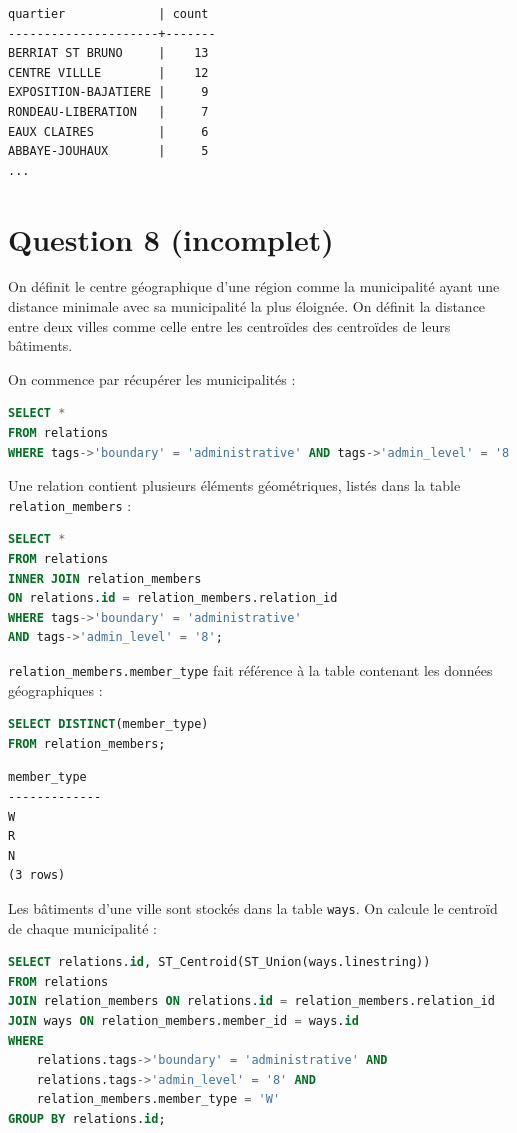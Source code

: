 \documentclass[12pt,a4paper]{article}
\begin{document}
\begin{lstlisting}
quartier             | count 
---------------------+-------
BERRIAT ST BRUNO     |    13
CENTRE VILLLE        |    12
EXPOSITION-BAJATIERE |     9
RONDEAU-LIBERATION   |     7
EAUX CLAIRES         |     6
ABBAYE-JOUHAUX       |     5
...
\end{lstlisting}

\vspace{1cm}
\section*{Question 8 (incomplet)}

On définit le centre géographique d'une région comme la municipalité ayant une
distance minimale avec sa municipalité la plus éloignée. On définit la distance
entre deux villes comme celle entre les centroïdes des centroïdes de leurs bâtiments.

On commence par récupérer les municipalités :

\begin{lstlisting}[language=SQL]
SELECT *
FROM relations
WHERE tags->'boundary' = 'administrative' AND tags->'admin_level' = '8';
\end{lstlisting}

Une relation contient plusieurs éléments géométriques, listés dans la table
\verb?relation_members? :

\begin{lstlisting}[language=SQL]
SELECT *
FROM relations
INNER JOIN relation_members 
ON relations.id = relation_members.relation_id
WHERE tags->'boundary' = 'administrative' 
AND tags->'admin_level' = '8';
\end{lstlisting}

\verb?relation_members.member_type? fait référence à la table contenant les données
géographiques :

\begin{lstlisting}[language=SQL]
SELECT DISTINCT(member_type)
FROM relation_members;
\end{lstlisting}

\begin{lstlisting}
member_type 
-------------
W
R
N
(3 rows)
\end{lstlisting}

Les bâtiments d'une ville sont stockés dans la table \verb?ways?. On calcule le centroïd
de chaque municipalité :

\begin{lstlisting}[language=SQL]
SELECT relations.id, ST_Centroid(ST_Union(ways.linestring))
FROM relations
JOIN relation_members ON relations.id = relation_members.relation_id
JOIN ways ON relation_members.member_id = ways.id
WHERE
    relations.tags->'boundary' = 'administrative' AND
    relations.tags->'admin_level' = '8' AND
    relation_members.member_type = 'W'
GROUP BY relations.id;
\end{lstlisting}
\end{document}
